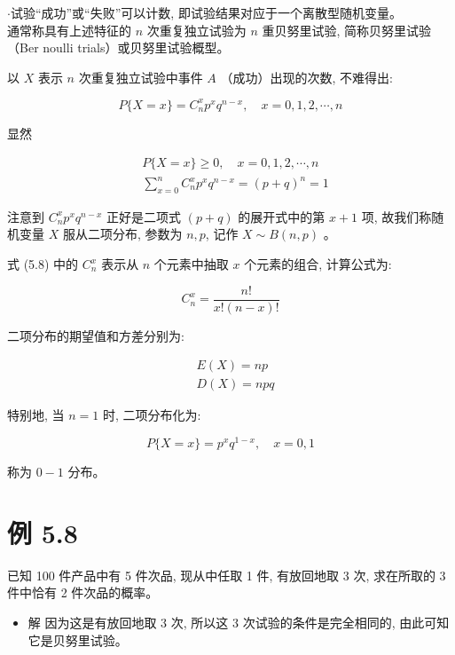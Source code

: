 \documentclass[10pt]{article}
\begin{document}
\begin{CJK*}{UTF8}{bsmi}
$\cdot$试验“成功”或“失败”可以计数, 即试验结果对应于一个离散型随机变量。\\
通常称具有上述特征的 $n$ 次重复独立试验为 $n$ 重贝努里试验, 简称贝努里试验（Ber noulli trials）或贝努里试验概型。

以 $X$ 表示 $n$ 次重复独立试验中事件 $A$ （成功）出现的次数, 不难得出:


\begin{equation*}
P\{X=x\}=C_{n}^{x} p^{x} q^{n-x}, \quad x=0,1,2, \cdots, n \tag{5.8}
\end{equation*}


显然

$$
\begin{aligned}
& P\{X=x\} \geqslant 0, \quad x=0,1,2, \cdots, n \\
& \sum_{x=0}^{n} C_{n}^{x} p^{x} q^{n-x}=(p+q)^{n}=1
\end{aligned}
$$

注意到 $C_{n}^{x} p^{x} q^{n-x}$ 正好是二项式 $(p+q)$ 的展开式中的第 $x+1$ 项, 故我们称随机变量 $X$ 服从二项分布, 参数为 $n, p$, 记作 $X \sim B(n, p)$ 。

式 (5.8) 中的 $C_{n}^{x}$ 表示从 $n$ 个元素中抽取 $x$ 个元素的组合, 计算公式为:


\begin{equation*}
C_{n}^{x}=\frac{n !}{x !(n-x) !} \tag{5.9}
\end{equation*}


二项分布的期望值和方差分别为:


\begin{align*}
& E(X)=n p  \tag{5.10}\\
& D(X)=n p q \tag{5.11}
\end{align*}


特别地, 当 $n=1$ 时, 二项分布化为:

$$
P\{X=x\}=p^{x} q^{1-x}, \quad x=0,1
$$

称为 $0-1$ 分布。

\section*{例 5.8}
已知 100 件产品中有 5 件次品, 现从中任取 1 件, 有放回地取 3 次, 求在所取的 3 件中恰有 2 件次品的概率。

\begin{itemize}
  \item 解 因为这是有放回地取 3 次, 所以这 3 次试验的条件是完全相同的, 由此可知它是贝努里试验。
\end{itemize}


\end{CJK*}
\end{document}
